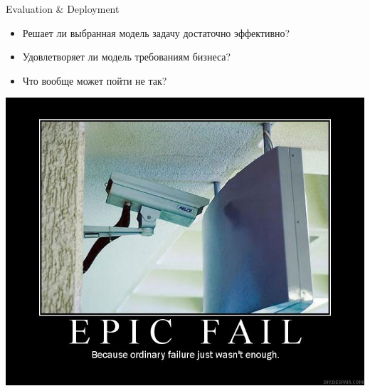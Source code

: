 \documentclass[10pt,a4paper]{beamer}
\begin{document}

\begin{frame}{Evaluation \& Deployment}

\begin{itemize}
\item Решает ли выбранная модель задачу достаточно эффективно?
\item Удовлетворяет ли модель требованиям бизнеса?
\item Что вообще может пойти не так?
\end{itemize}

\begin{center}
\includegraphics[scale=0.25]{images/fail.jpg}
\end{center}

\end{frame}

\end{document}
